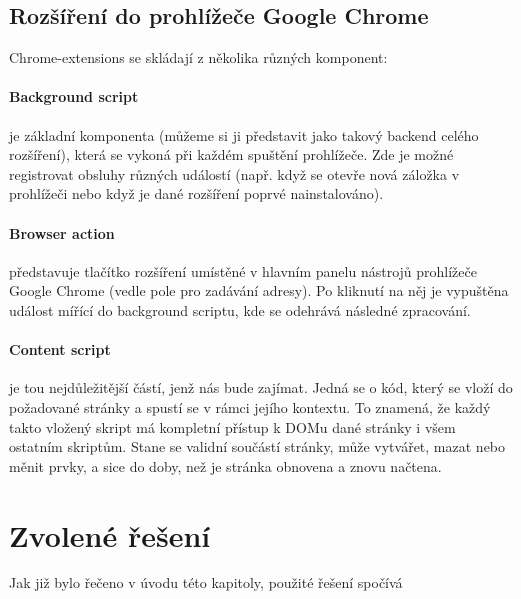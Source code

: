 \documentclass[thesis=B,czech]{FITthesis2}[2012/06/26]
\begin{document}
	\subsection{Rozšíření do prohlížeče Google Chrome}
	Chrome-extensions se skládají z několika různých komponent:
	\paragraph{Background script} je základní komponenta (můžeme si ji představit jako takový backend celého rozšíření), která se vykoná při každém spuštění prohlížeče. Zde je možné registrovat obsluhy různých událostí (např. když se otevře nová záložka v prohlížeči nebo když je dané rozšíření poprvé nainstalováno). 
	\paragraph{Browser action} představuje tlačítko rozšíření umístěné v hlavním panelu nástrojů prohlížeče Google Chrome (vedle pole pro zadávání adresy). Po kliknutí na něj je vypuštěna událost mířící do background scriptu, kde se odehrává následné zpracování.
	\paragraph{Content script} je tou nejdůležitější částí, jenž nás bude zajímat. Jedná se o kód, který se vloží do požadované stránky a spustí se v rámci jejího kontextu. To znamená, že každý takto vložený skript má kompletní přístup k DOMu dané stránky i všem ostatním skriptům. Stane se validní součástí stránky, může vytvářet, mazat nebo měnit prvky, a sice do doby, než je stránka obnovena a znovu načtena.
	
	\section{Zvolené řešení}
	Jak již bylo řečeno v úvodu této kapitoly, použité řešení spočívá 
	
	
	
	
	\begin{conclusion}
	\end{conclusion}
	
	
	
\end{document}
